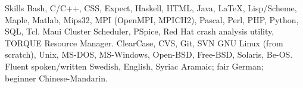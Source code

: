 \documentclass{../../cls/cv}
\begin{document}
\begin{category}{Skills}
\citembullet Bash, C/C++, CSS, Expect, Haskell, HTML, Java, \LaTeX, Lisp/Scheme, Maple, Matlab,
Mips32, MPI (OpenMPI, MPICH2), Pascal, Perl, PHP, Python, SQL, Tcl.
\citembullet Maui Cluster Scheduler, PSpice, Red Hat crash analysis utility, TORQUE Resource Manager.
\citembullet ClearCase, CVS, Git, SVN
\citembullet GNU Linux (from scratch), Unix, MS-DOS, MS-Windows, Open-BSD, Free-BSD, Solaris, Be-OS.  
\citembullet Fluent spoken/written Swedish, English, Syriac Aramaic;
fair German; \\ beginner Chinese-Mandarin.
\end{category}


\end{document}
